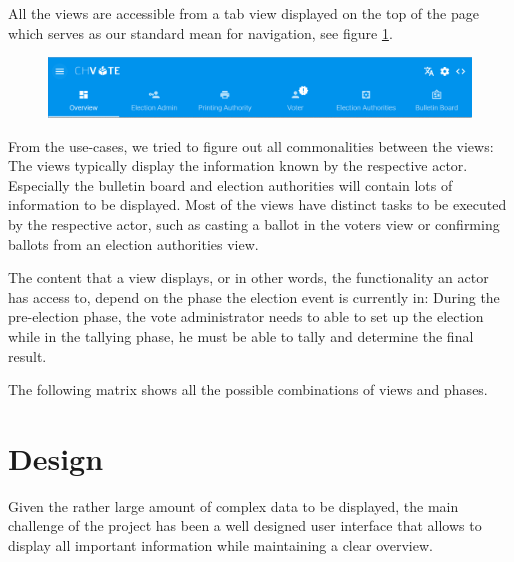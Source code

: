 All the views are accessible from a tab view displayed on the top of the page which serves as our standard mean for navigation, see figure \ref{Navigation}.

\begin{figure}[p]
\begin{center}
\includegraphics[scale=0.44]{assets/screenshots/navigation.png}
\label{Navigation}%
\end{center}
\end{figure}

From the use-cases, we tried to figure out all commonalities between the views: The views typically display the information known by the respective actor. Especially the bulletin board and election authorities will contain lots of information to be displayed. Most of the views have distinct tasks to be executed by the respective actor, such as casting a ballot in the voters view or confirming ballots from an election authorities view.

The content that a view displays, or in other words, the functionality an actor has access to, depend on the phase the election event is currently in: During the pre-election phase, the vote administrator needs to able to set up the election while in the tallying phase, he must be able to tally and determine the final result.


The following matrix shows all the possible combinations of views and phases.

\section{Design}
Given the rather large amount of complex data to be displayed, the main challenge of the project has been a well designed user interface that allows to display all important information while maintaining a clear overview.

